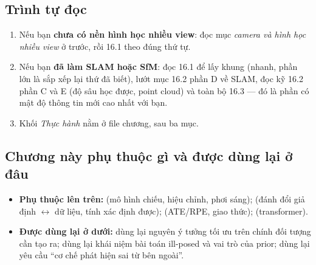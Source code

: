 \documentclass[../../deep_learning.tex]{subfiles}
\begin{document}
\subsection*{Trình tự đọc}
\begin{enumerate}
\item Nếu bạn \textbf{chưa có nền hình học nhiều view}: đọc mục \emph{camera và hình học nhiều view} ở
   trước, rồi 16.1   theo đúng thứ tự.
\item Nếu bạn \textbf{đã làm SLAM hoặc SfM}: đọc 16.1 để lấy khung (nhanh, phần lớn là sắp xếp lại thứ đã biết), lướt mục 16.2 phần D về SLAM, đọc kỹ 16.2 phần C và E (độ sâu học được, point cloud) và toàn bộ 16.3 --- đó là phần có mật độ thông tin mới cao nhất với bạn.
\item Khối \emph{Thực hành} nằm ở file chương, sau ba mục.
\end{enumerate}

\subsection*{Chương này phụ thuộc gì và được dùng lại ở đâu}
\begin{itemize}
\item \textbf{Phụ thuộc lên trên:}  (mô hình chiếu, hiệu chỉnh, phơi sáng);  (đánh đổi giả định \(\leftrightarrow\) dữ liệu, tính xác định được);  (ATE/RPE, giao thức);  (transformer).
\item \textbf{Được dùng lại ở dưới:}  dùng lại nguyên ý tưởng tối ưu trên chính đối tượng cần tạo ra;  dùng lại khái niệm bài toán ill-posed và vai trò của prior;  dùng lại yêu cầu ``cơ chế phát hiện sai từ bên ngoài''.
\end{itemize}
\end{document}
